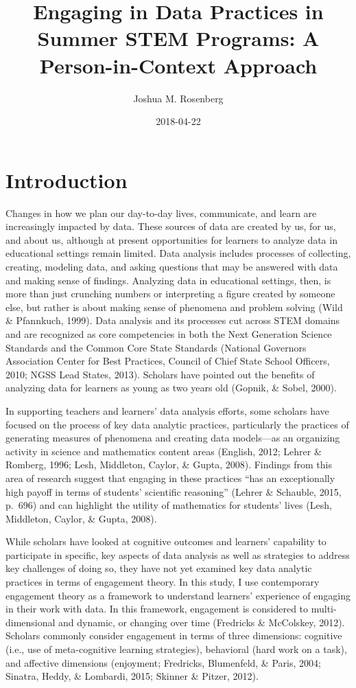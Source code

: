 \documentclass[]{book}
\title{Engaging in Data Practices in Summer STEM Programs: A Person-in-Context
Approach}
\author{Joshua M. Rosenberg}
\date{2018-04-22}
\theoremstyle{definition}
\theoremstyle{definition}
\theoremstyle{definition}
\theoremstyle{remark}
\begin{document}
\maketitle

{
\setcounter{tocdepth}{1}
\tableofcontents
}
\chapter{Introduction}\label{intro-placemarker}

Changes in how we plan our day-to-day lives, communicate, and learn are
increasingly impacted by data. These sources of data are created by us,
for us, and about us, although at present opportunities for learners to
analyze data in educational settings remain limited. Data analysis
includes processes of collecting, creating, modeling data, and asking
questions that may be answered with data and making sense of findings.
Analyzing data in educational settings, then, is more than just
crunching numbers or interpreting a figure created by someone else, but
rather is about making sense of phenomena and problem solving (Wild \&
Pfannkuch, 1999). Data analysis and its processes cut across STEM
domains and are recognized as core competencies in both the Next
Generation Science Standards and the Common Core State Standards
(National Governors Association Center for Best Practices, Council of
Chief State School Officers, 2010; NGSS Lead States, 2013). Scholars
have pointed out the benefits of analyzing data for learners as young as
two years old (Gopnik, \& Sobel, 2000).

In supporting teachers and learners' data analysis efforts, some
scholars have focused on the process of key data analytic practices,
particularly the practices of generating measures of phenomena and
creating data models---as an organizing activity in science and
mathematics content areas (English, 2012; Lehrer \& Romberg, 1996; Lesh,
Middleton, Caylor, \& Gupta, 2008). Findings from this area of research
suggest that engaging in these practices ``has an exceptionally high
payoff in terms of students' scientific reasoning'' (Lehrer \& Schauble,
2015, p.~696) and can highlight the utility of mathematics for students'
lives (Lesh, Middleton, Caylor, \& Gupta, 2008).

While scholars have looked at cognitive outcomes and learners'
capability to participate in specific, key aspects of data analysis as
well as strategies to address key challenges of doing so, they have not
yet examined key data analytic practices in terms of engagement theory.
In this study, I use contemporary engagement theory as a framework to
understand learners' experience of engaging in their work with data. In
this framework, engagement is considered to multi-dimensional and
dynamic, or changing over time (Fredricks \& McColskey, 2012). Scholars
commonly consider engagement in terms of three dimensions: cognitive
(i.e., use of meta-cognitive learning strategies), behavioral (hard work
on a task), and affective dimensions (enjoyment; Fredricks, Blumenfeld,
\& Paris, 2004; Sinatra, Heddy, \& Lombardi, 2015; Skinner \& Pitzer,
2012).
\end{document}
